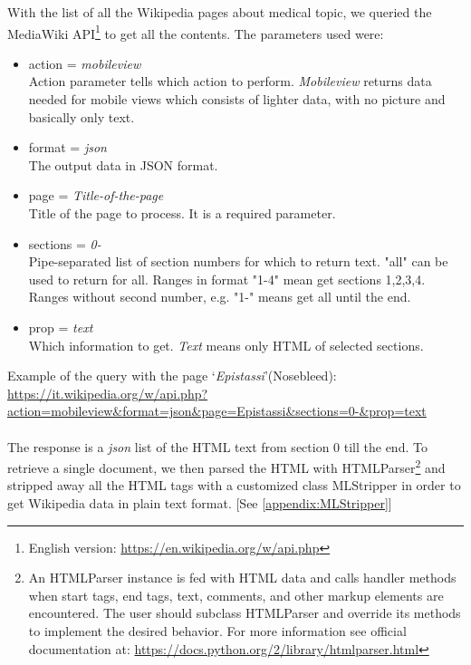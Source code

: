 With the list of all the Wikipedia pages about medical topic, we queried the MediaWiki API\footnote{English version: \url{https://en.wikipedia.org/w/api.php}} to get all the contents. 
The parameters used were:
\begin{itemize}
	\item action = \textit{mobileview} \\
	Action parameter tells which action to perform. \textit{Mobileview} returns data needed for mobile views which consists of lighter data, with no picture and basically only text.
	\item format = \textit{json} \\
	The output data in JSON format.
	\item page = \textit{Title-of-the-page} \\
	Title of the page to process. It is a required parameter.
	\item sections = \textit{0-} \\
	Pipe-separated list of section numbers for which to return text. "all" can be used to return for all. Ranges in format "1-4" mean get sections 1,2,3,4. Ranges without second number, e.g. "1-" means get all until the end.
	\item prop = \textit{text} \\
	Which information to get. \textit{Text} means only HTML of selected sections.
\end{itemize}
Example of the query with the page \enquote*{\textit{Epistassi}}(Nosebleed):\\
\url{https://it.wikipedia.org/w/api.php?action=mobileview\&format=json\&page=Epistassi\&sections=0-\&prop=text}
\\\\
The response is a \textit{json} list of the HTML text from section 0 till the end. To retrieve a single document, we then parsed the HTML with HTMLParser\footnote{An HTMLParser instance is fed with HTML data and calls handler methods when start tags, end tags, text, comments, and other markup elements are encountered. The user should subclass HTMLParser and override its methods to implement the desired behavior. For more information see official documentation at: \url{https://docs.python.org/2/library/htmlparser.html}} and stripped away all the HTML tags with a customized class MLStripper in order to get Wikipedia data in plain text format. [See \ref{appendix:MLStripper}]



